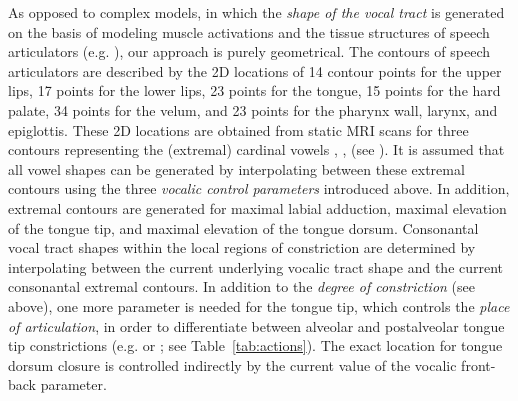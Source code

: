 \documentclass[conference]{IEEEtran}
\let\ipa\textipa
\begin{document}
As opposed to complex models,
in which the \textit{shape of the vocal tract} is
generated on the basis of modeling muscle activations and the tissue structures of
speech articulators (e.g. \cite{dang2004}), our approach is purely
geometrical. The contours of speech articulators are described by the
2D locations of 14 contour points for the upper lips, 17 points for
the lower lips, 23 points for the tongue,
15 points for the hard palate, 34 points for the velum,
and 23 points for the pharynx wall, larynx, and epiglottis.
These 2D locations are obtained from static MRI scans
for three contours representing the (extremal) cardinal vowels \ipa{[i]}, \ipa{[A]},
\ipa{[u]} (see \cite{kroger2005,kroger2004}). It is assumed that all vowel
shapes can be generated by interpolating between these extremal contours
using the three \textit{vocalic control parameters} introduced above.
In addition, extremal contours are generated for maximal labial
adduction, maximal elevation of the tongue tip, and
maximal elevation of the tongue dorsum.
Consonantal vocal tract shapes
within the local regions of constriction are
determined by interpolating between the current underlying vocalic
tract shape and the current consonantal extremal contours.
In addition to the \textit{degree of constriction} (see above),
one more parameter is needed for the
tongue tip, which controls the \textit{place of articulation},
in order to differentiate between alveolar and postalveolar tongue tip
constrictions (e.g. \ipa{[s]} or \ipa{[S]}; see Table~\ref{tab:actions}). The
exact location for tongue dorsum closure is controlled indirectly by
the current value of the vocalic front-back parameter.
\end{document}
